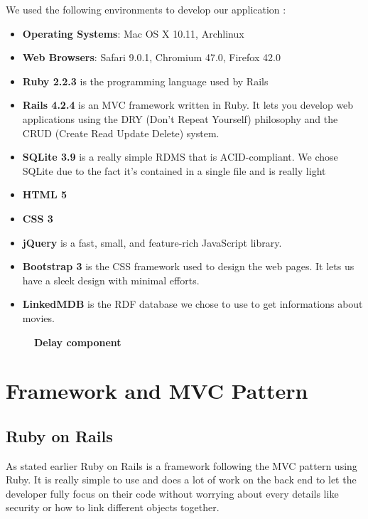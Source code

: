 \documentclass[12pt,a4paper]{article}
\begin{document}
We used the following environments to develop our application :

\begin{itemize}
\item \textbf{Operating Systems}: Mac OS X 10.11, Archlinux
\item \textbf{Web Browsers}: Safari 9.0.1, Chromium 47.0, Firefox 42.0
\item \textbf{Ruby 2.2.3} is the programming language used by Rails
\item \textbf{Rails 4.2.4} is an MVC framework written in Ruby. It lets you develop web applications using the DRY (Don't Repeat Yourself) philosophy and the CRUD (Create Read Update Delete) system.

\item \textbf{SQLite 3.9} is a really simple RDMS that is ACID-compliant. We chose SQLite due to the fact it's contained in a single file and is really light
\item \textbf{HTML 5} 
\item \textbf{CSS 3}
\item \textbf{jQuery} is a fast, small, and feature-­rich JavaScript library.
\item \textbf{Bootstrap 3} is the CSS framework used to design the web pages. It lets us have a sleek design with minimal efforts.
\item \textbf{LinkedMDB} is the RDF database we chose to use to get informations about movies.
\end{itemize}

\begin{figure}[h]
\begin{center}
\end{center}
\caption{\textbf{Delay component}}
\label{splitdelay}
\end{figure}

\section{Framework and MVC Pattern}
\subsection{Ruby on Rails}
As stated earlier Ruby on Rails is a framework following the MVC pattern using Ruby. It is really simple to use and does a lot of work on the back end to let the developer fully focus on their code without worrying about every details like security or how to link different objects together.
\end{document}
